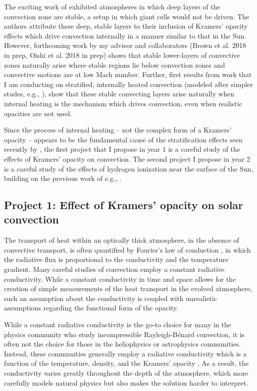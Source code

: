 \documentclass[aasms,12pt]{article}
\newcommand{\RB}{Rayleigh-B\'{e}nard }
\begin{document}
The exciting work of \cite{kapyla&all2017}
exhibited atmospheres in which deep layers of the convection
zone are stable, a setup in which giant cells would not be driven.  
The authors attribute these deep, stable layers to their inclusion of Kramers' opacity
effects which drive convection internally in a manner similar to that in the Sun.  
However, forthcoming work by my advisor and collaborators (Brown et al. 2018 in prep, Oishi et al. 2018 in prep) 
shows that 
stable lower-layers of convective zones naturally arise where stable regions lie below convection
zones and convective motions are at low Mach number.
Further, first results from work that I am conducting on stratified, internally
heated convection (modeled after simpler studes, e.g., \cite{goluskin&spiegel2012}),
show that these stable convecting layers arise naturally when internal heating is the mechanism which
drives convection, even when realistic opacities are not used.

Since the process of internal heating -- not the complex form of a Kramers' opacity --
appears to be the fundamental cause of the stratification effects seen recently by \cite{kapyla&all2017},
the first project that I propose in year 1 is a careful study of the effects of Kramers' opacity on convection.
The second project I propose in year 2 is a careful study of the effects of hydrogen ionization near the surface
of the Sun, building on the previous work of e.g., \cite{rast&toomre1993}.

\vspace{-0.25cm}
\subsection{Project 1: Effect of Kramers' opacity on solar convection}
\vspace{-0.15cm}
The transport of heat within an optically thick atmosphere, in the absence of convective transport,
is often quantified by Fourier's law of conduction \citep{lecoanet&all2014}, in which the radiative
flux is proportional to the conductivity and the temperature gradient.  
Many careful studies of convection employ a constant radiative conductivity.
While a constant conductivity in time and space allows for the creation of simple measurements of the
heat transport in the evolved atmosphere, such an assumption about
the conductivity is coupled with unrealistic assumptions regarding the functional form of the opacity.  

While a constant radiative
conductivity is the go-to choice for many in the physics community who study incompressible
\RB convection, it is often not the choice for those in the heliophysics or astrophysics
communities.  Instead, these communities generally employ a radiative conductivity which is a function
of the temperature, density, and the Kramers' opacity \citep{barekat&brandenburg2014, brandenburg2016, kapyla&all2017}.
As a result, the conductivity varies greatly throughout the depth of the atmosphere, which 
more carefully models natural physics but also makes the solution harder to interpret.
\end{document}
